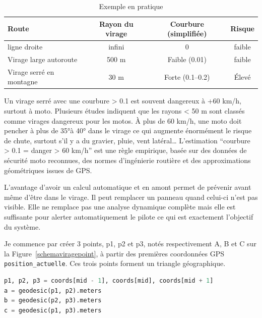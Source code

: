 \begin{table}[ht]
\centering
\begin{tabular}{|l|c|c|c|}
\hline
Route & Rayon du virage & Courbure (simplifiée) & Risque \\
\hline
ligne droite & infini & 0 & faible \\
Virage large autoroute & 500 m & Faible (0.01) & faible \\
Virage serré en montagne & 30 m & Forte (0.1–0.2) & Élevé \\
\hline
\end{tabular}
\caption{Exemple en pratique}
\end{table}

Un virage serré avec une courbure > 0.1 est souvent dangereux à +60 km/h, surtout à moto.
Plusieurs études indiquent que les rayons < 50 m sont classés comme virages dangereux pour les motos. À plus de 60 km/h, une moto doit pencher à plus de 35°à 40° dans le virage ce qui augmente énormément le risque de chute, surtout s’il y a du gravier, pluie, vent latéral…
L’estimation “courbure > 0.1 = danger > 60 km/h” est une règle empirique, basée sur des données de sécurité moto reconnues, des normes d'ingénierie routière et des approximations géométriques issues de GPS.


L'avantage d'avoir un calcul automatique et en amont permet de prévenir avant même d'être dans le virage. Il peut remplacer un panneau quand celui-ci n'est pas visible. Elle ne remplace pas une analyse dynamique complète mais elle est suffisante pour alerter automatiquement le pilote ce qui est exactement l’objectif du système.

Je commence par créer 3 points, p1, p2 et p3, notés respectivement A, B et C sur la Figure~\ref{schemaviragepoint}, à partir des premières coordonnées GPS \texttt{position\_actuelle}. Ces trois points forment un triangle géographique.
\begin{lstlisting}[language=Python, caption={Calcul de points}]
p1, p2, p3 = coords[mid - 1], coords[mid], coords[mid + 1]
a = geodesic(p1, p2).meters
b = geodesic(p2, p3).meters
c = geodesic(p1, p3).meters
\end{lstlisting}

